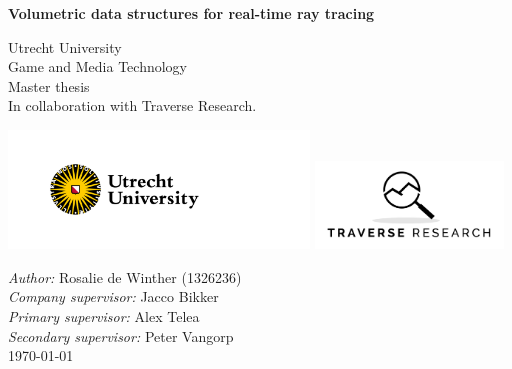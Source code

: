 \documentclass{article}
\begin{document}
\begin{titlepage}
    \begin{center}
        \vspace*{4cm}

        \hline
        \vspace{.5cm}
        \textbf{\huge Volumetric data structures for real-time ray tracing}
        \vspace{.5cm}
        \hline

        \vspace{1cm}

        
            
            \large Utrecht University\\
            Game and Media Technology\\
            Master thesis\\
            \vspace{.5cm}
            \large In collaboration with Traverse Research.
            

        \vspace{6cm}

        \includegraphics[width = 8cm]{figures/UU_logo_2021_EN_RGB.png}
        \hfill
        \includegraphics[width = 5cm]{figures/Traverse+Research+Cropped.png}

        \vspace{1cm}

        \raggedright \textit{Author:} Rosalie de Winther (1326236)\\
        \textit{Company supervisor:} Jacco Bikker\\
        \textit{Primary supervisor:} Alex Telea\\
        \textit{Secondary supervisor:} Peter Vangorp\\
        \today

    \end{center}
\end{titlepage}



\clearpage

\clearpage

\clearpage
\tableofcontents
\clearpage

\clearpage

\clearpage

\clearpage

\clearpage

\clearpage

\clearpage

\clearpage

\clearpage




\end{document}
